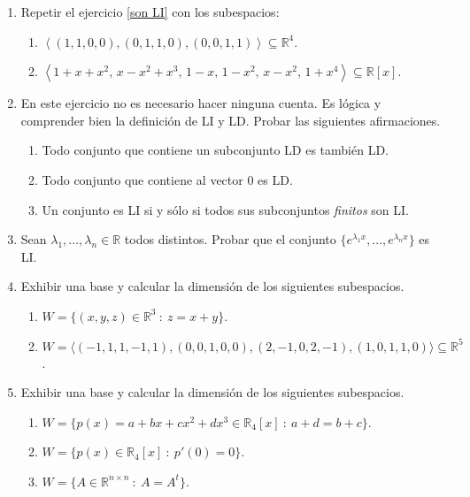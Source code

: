\begin{enumerate}[resume, topsep=6pt, itemsep=.4cm]
\item  Repetir el ejercicio \ref{son LI} con los subespacios:

\begin{enumerate}
    \item ${\left\langle(1,1,0,0),(0,1,1,0),(0,0,1,1)\right\rangle}\subseteq \mathbb{R}^4$.
    \item ${\left\langle 1+x+x^2,\, x-x^2+x^3,\, 1-x,\, 1-x^2,\, x-x^2,\, 1+x^4\right\rangle}\subseteq \mathbb{R}[x]$.
\end{enumerate}


\item En este ejercicio no es necesario hacer ninguna cuenta. Es lógica y comprender bien la definición de LI y LD. Probar las siguientes afirmaciones.
\begin{enumerate}
\item Todo conjunto que contiene un subconjunto LD es también LD.
\item Todo conjunto que contiene al vector 0 es LD.
\item Un conjunto es LI si y sólo si todos sus subconjuntos \emph{finitos} son LI.
\end{enumerate}


\item Sean $\lambda_1, ..., \lambda_n\in\mathbb{R}$ todos distintos. Probar que el conjunto $\{e^{\lambda_1x}, ..., e^{\lambda_nx}\}$ es LI.


\item  Exhibir una base y calcular la dimensión de los siguientes subespacios.

\begin{enumerate}
    \item $W=\{(x,y,z) \in \mathbb{R}^3 \ : \ z = x + y \}$.
    \item $W = \langle (-1, 1, 1, -1, 1),  (0, 0, 1, 0, 0), (2, -1, 0, 2, -1), (1, 0, 1, 1, 0) \rangle \subseteq \mathbb R^5$.
\end{enumerate}


\item Exhibir una base y calcular la dimensión de los siguientes subespacios.
\begin{enumerate}
    \item $W = \{ p(x)=a+bx+cx^2+dx^3\in \mathbb{R}_{4}[x] \ : \ a+d=b+c \}$.
\item $W= \{ p(x)\in \mathbb{R}_{4}[x] \ : \ p'(0)=0 \}$.
    \item $W = \{A \in \mathbb{R}^{n\times n} \ : \ A = A^t\}$.
\end{enumerate}


\end{enumerate}
